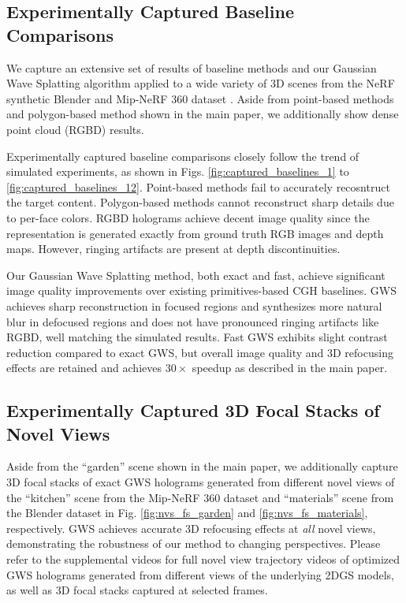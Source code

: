 \subsection{Experimentally Captured Baseline Comparisons}

We capture an extensive set of results of baseline methods and our Gaussian Wave Splatting algorithm applied to a wide variety of 3D scenes from the NeRF synthetic Blender \cite{mildenhall2020nerf} and Mip-NeRF 360 dataset \cite{barron2022mipnerf360}. Aside from point-based methods and polygon-based method shown in the main paper, we additionally show dense point cloud (RGBD) results.

Experimentally captured baseline comparisons closely follow the trend of simulated experiments, as shown in Figs. \ref{fig:captured_baselines_1} to \ref{fig:captured_baselines_12}. Point-based methods fail to accurately recosntruct the target content. Polygon-based methods cannot reconstruct sharp details due to per-face colors. RGBD holograms achieve decent image quality since the representation is generated exactly from ground truth RGB images and depth maps. However, ringing artifacts are present at depth discontinuities. 

Our Gaussian Wave Splatting method, both exact and fast, achieve significant image quality improvements over existing primitives-based CGH baselines. GWS achieves sharp reconstruction in focused regions and synthesizes more natural blur in defocused regions and does not have pronounced ringing artifacts like RGBD, well matching the simulated results. Fast GWS exhibits slight contrast reduction compared to exact GWS, but overall image quality and 3D refocusing effects are retained and achieves $30\times$ speedup as described in the main paper.

\subsection{Experimentally Captured 3D Focal Stacks of Novel Views}

Aside from the ``garden'' scene shown in the main paper, we additionally capture 3D focal stacks of exact GWS holograms generated from different novel views of the ``kitchen'' scene from the Mip-NeRF 360 dataset and ``materials'' scene from the Blender dataset in Fig. \ref{fig:nvs_fs_garden} and \ref{fig:nvs_fs_materials}, respectively. GWS achieves accurate 3D refocusing effects at \textit{all} novel views, demonstrating the robustness of our method to changing perspectives. Please refer to the supplemental videos for full novel view trajectory videos of optimized GWS holograms generated from different views of the underlying 2DGS models, as well as 3D focal stacks captured at selected frames. 

